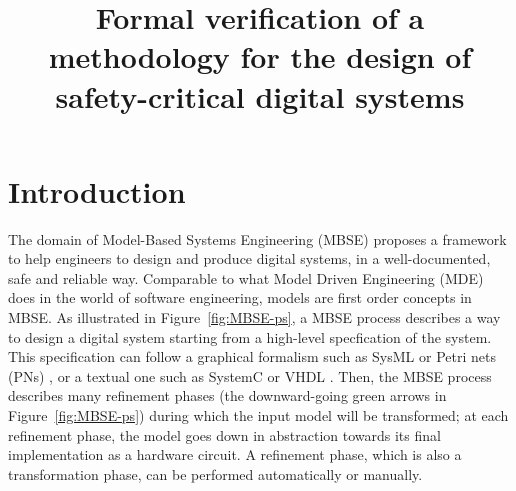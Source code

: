 \documentclass[pdflatex,sn-mathphys]{sn-jnl}%
\theoremstyle{thmstyleone}%
\theoremstyle{thmstyletwo}%
\theoremstyle{thmstylethree}%
\begin{document}
\title[Formal verification of the \hilecop{} methodology]{Formal
  verification of a methodology for the design of safety-critical
  digital systems}


\author*[1]{ }
\author[1]{ }
\author[1,2]{ }




\abstract{}

\keywords{}

\maketitle

\section{Introduction}
\label{sec:intro}

The domain of Model-Based Systems Engineering (MBSE) \cite{Long2011}
proposes a framework to help engineers to design and produce digital
systems, in a well-documented, safe and reliable way. Comparable to
what Model Driven Engineering (MDE) does in the world of software
engineering, models are first order concepts in MBSE.  As illustrated
in Figure~\ref{fig:MBSE-ps}, a MBSE process describes a way to design
a digital system starting from a high-level specfication of the
system. This specification can follow a graphical formalism such as
SysML \cite{Friedenthal2014} or Petri nets (PNs) \cite{Petri1962}, or
a textual one such as SystemC \cite{Black2009} or VHDL
\cite{Ashenden2010}. Then, the MBSE process describes many refinement
phases (the downward-going green arrows in Figure~\ref{fig:MBSE-ps})
during which the input model will be transformed; at each refinement
phase, the model goes down in abstraction towards its final
implementation as a hardware circuit. A refinement phase, which is
also a transformation phase, can be performed automatically or
manually.
\end{document}
